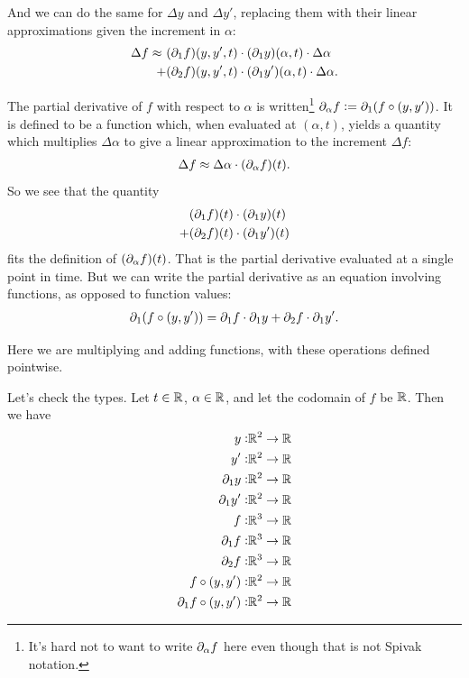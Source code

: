 And we can do the same for $\Delta y$ and $\Delta y'$, replacing them with their linear
approximations given the increment in $\alpha$:
\begin{align*}
  \Delta f \approx ~ &(\partial_1 f)(y, y', t) \cdot (\partial_1 y)(\alpha, t) \cdot \Delta \alpha \\
                   + &(\partial_2 f)(y, y', t) \cdot (\partial_1 y')(\alpha, t) \cdot \Delta \alpha.
\end{align*}

The partial derivative of $f$ with respect to $\alpha$ is written\footnote{It's hard not to want to
  write $\partial_\alpha f$ here even though that is not Spivak notation.}
$\partial_\alpha f := \partial_1 (f \circ (y, y'))$. It is defined to be a function which, when evaluated at
$(\alpha, t)$, yields a quantity which multiplies $\Delta\alpha$ to give a linear approximation to the
increment $\Delta f$:
\begin{align*}
  \Delta f \approx \Delta\alpha \cdot (\partial_\alpha f)(t).
\end{align*}
So we see that the quantity
\begin{align*}
    &(\partial_1 f)(t) \cdot (\partial_1 y)(t) \\
  + &(\partial_2 f)(t) \cdot (\partial_1 y')(t)
\end{align*}
fits the definition of $(\partial_\alpha f)(t)$. That is the partial derivative evaluated at a single
point in time. But we can write the partial derivative as an equation involving functions, as
opposed to function values:
\begin{align*}
  \partial_1 (f \circ (y, y')) = \partial_1 f \cdot \partial_1 y + \partial_2 f \cdot \partial_1 y'.
\end{align*}

Here we are multiplying and adding functions, with these operations defined pointwise.

Let's check the types. Let $t \in \mathbb{R}$, $\alpha \in \mathbb{R}$, and let the codomain of $f$ be $\mathbb{R}$. Then
we have
\begin{align*}
  y:                      &\mathbb{R}^2 \to \mathbb{R} \\
  y':                     &\mathbb{R}^2 \to \mathbb{R} \\
  \partial_1 y:               &\mathbb{R}^2 \to \mathbb{R} \\
  \partial_1 y':              &\mathbb{R}^2 \to \mathbb{R} \\
  f:                      &\mathbb{R}^3 \to \mathbb{R} \\
  \partial_1 f:               &\mathbb{R}^3 \to \mathbb{R} \\
  \partial_2 f:               &\mathbb{R}^3 \to \mathbb{R} \\
  f \circ (y, y'):        &\mathbb{R}^2 \to \mathbb{R} \\
  \partial_1 f \circ (y, y'): &\mathbb{R}^2 \to \mathbb{R}
\end{align*}

